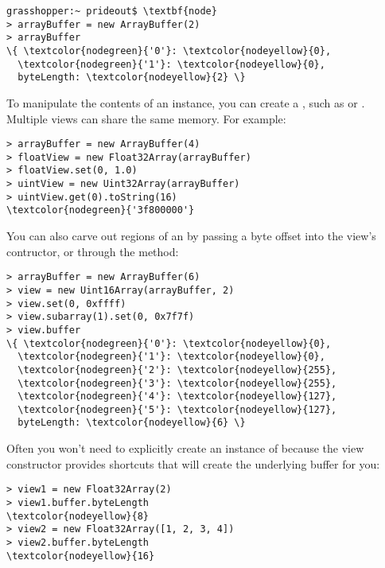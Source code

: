 \begin{Verbatim}[fontsize=\footnotesize,commandchars=\\\{\}]
grasshopper:~ prideout$ \textbf{node}
> arrayBuffer = new ArrayBuffer(2)
> arrayBuffer
\{ \textcolor{nodegreen}{'0'}: \textcolor{nodeyellow}{0},
  \textcolor{nodegreen}{'1'}: \textcolor{nodeyellow}{0},
  byteLength: \textcolor{nodeyellow}{2} \}
\end{Verbatim}

To manipulate the contents of an  instance, you can create a , such as  or .  Multiple views can share the same memory.  For example:

\begin{Verbatim}[fontsize=\footnotesize,commandchars=\\\{\}]
> arrayBuffer = new ArrayBuffer(4)
> floatView = new Float32Array(arrayBuffer)
> floatView.set(0, 1.0)
> uintView = new Uint32Array(arrayBuffer)
> uintView.get(0).toString(16)
\textcolor{nodegreen}{'3f800000'}
\end{Verbatim}

You can also carve out regions of an  by passing a byte offset into the view's contructor, or through the  method:

\begin{Verbatim}[fontsize=\footnotesize,commandchars=\\\{\}]
> arrayBuffer = new ArrayBuffer(6)
> view = new Uint16Array(arrayBuffer, 2)
> view.set(0, 0xffff)
> view.subarray(1).set(0, 0x7f7f)
> view.buffer
\{ \textcolor{nodegreen}{'0'}: \textcolor{nodeyellow}{0},
  \textcolor{nodegreen}{'1'}: \textcolor{nodeyellow}{0},
  \textcolor{nodegreen}{'2'}: \textcolor{nodeyellow}{255},
  \textcolor{nodegreen}{'3'}: \textcolor{nodeyellow}{255},
  \textcolor{nodegreen}{'4'}: \textcolor{nodeyellow}{127},
  \textcolor{nodegreen}{'5'}: \textcolor{nodeyellow}{127},
  byteLength: \textcolor{nodeyellow}{6} \}
\end{Verbatim}

Often you won't need to explicitly create an instance of  because the view constructor provides shortcuts that will create the underlying buffer for you:

\begin{Verbatim}[fontsize=\footnotesize,commandchars=\\\{\}]
> view1 = new Float32Array(2)
> view1.buffer.byteLength
\textcolor{nodeyellow}{8}
> view2 = new Float32Array([1, 2, 3, 4])
> view2.buffer.byteLength
\textcolor{nodeyellow}{16}
\end{Verbatim}

